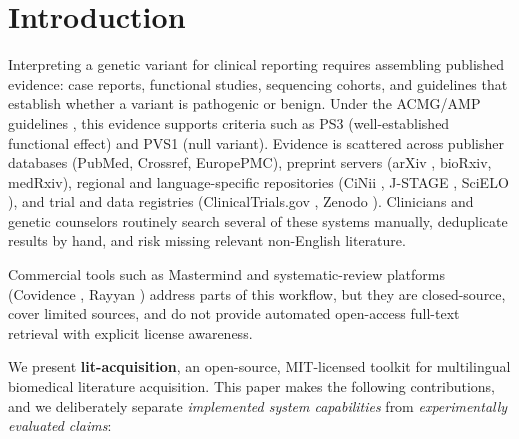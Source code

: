 \documentclass[sigconf,screen]{acmart}
\begin{document}

\maketitle

\section{Introduction}
\label{sec:intro}

Interpreting a genetic variant for clinical reporting requires assembling
published evidence: case reports, functional studies, sequencing cohorts,
and guidelines that establish whether a variant is pathogenic or benign.
Under the ACMG/AMP guidelines \cite{richards2015standards}, this evidence
supports criteria such as PS3 (well-established functional effect) and PVS1
(null variant). Evidence is scattered across publisher databases (PubMed,
Crossref, EuropePMC), preprint servers (arXiv \cite{ginsparg1994arxiv},
bioRxiv, medRxiv), regional
and language-specific repositories (CiNii \cite{cinii}, J-STAGE
\cite{jstage}, SciELO \cite{scielo}), and trial and
data registries (ClinicalTrials.gov \cite{zarin2016clinicaltrials},
Zenodo \cite{zenodo}). Clinicians and genetic
counselors routinely search several of these systems manually, deduplicate
results by hand, and risk missing relevant non-English literature.

Commercial tools such as Mastermind \cite{mastermind} and systematic-review
platforms (Covidence \cite{covidence}, Rayyan \cite{ouzzani2016rayyan})
address parts of this workflow, but they are closed-source, cover limited
sources, and do not provide automated open-access full-text retrieval with
explicit license awareness.

We present \textbf{lit-acquisition}, an open-source, MIT-licensed toolkit for
multilingual biomedical literature acquisition. This paper makes the
following contributions, and we deliberately separate \emph{implemented
system capabilities} from \emph{experimentally evaluated claims}:
\end{document}
